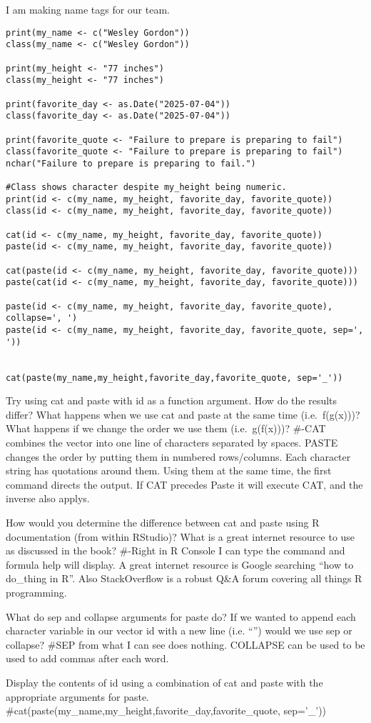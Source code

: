 \documentclass[]{article}
\begin{document}
I am making name tags for our team.

\begin{verbatim}
print(my_name <- c("Wesley Gordon"))
class(my_name <- c("Wesley Gordon"))

print(my_height <- "77 inches")
class(my_height <- "77 inches")

print(favorite_day <- as.Date("2025-07-04"))
class(favorite_day <- as.Date("2025-07-04"))

print(favorite_quote <- "Failure to prepare is preparing to fail")
class(favorite_quote <- "Failure to prepare is preparing to fail")
nchar("Failure to prepare is preparing to fail.")

#Class shows character despite my_height being numeric.
print(id <- c(my_name, my_height, favorite_day, favorite_quote))
class(id <- c(my_name, my_height, favorite_day, favorite_quote)) 

cat(id <- c(my_name, my_height, favorite_day, favorite_quote))
paste(id <- c(my_name, my_height, favorite_day, favorite_quote))

cat(paste(id <- c(my_name, my_height, favorite_day, favorite_quote)))
paste(cat(id <- c(my_name, my_height, favorite_day, favorite_quote)))

paste(id <- c(my_name, my_height, favorite_day, favorite_quote), collapse=', ')
paste(id <- c(my_name, my_height, favorite_day, favorite_quote, sep=', '))


cat(paste(my_name,my_height,favorite_day,favorite_quote, sep='_'))
\end{verbatim}

Try using cat and paste with id as a function argument. How do the
results differ? What happens when we use cat and paste at the same time
(i.e.~f(g(x)))? What happens if we change the order we use them
(i.e.~g(f(x)))? \#-CAT combines the vector into one line of characters
separated by spaces. PASTE changes the order by putting them in numbered
rows/columns. Each character string has quotations around them. Using
them at the same time, the first command directs the output. If CAT
precedes Paste it will execute CAT, and the inverse also applys.

How would you determine the difference between cat and paste using R
documentation (from within RStudio)? What is a great internet resource
to use as discussed in the book? \#-Right in R Console I can type the
command and formula help will display. A great internet resource is
Google searching ``how to do\_thing in R''. Also StackOverflow is a
robust Q\&A forum covering all things R programming.

What do sep and collapse arguments for paste do? If we wanted to append
each character variable in our vector id with a new line (i.e. ``\n'')
would we use sep or collapse? \#SEP from what I can see does nothing.
COLLAPSE can be used to be used to add commas after each word.

Display the contents of id using a combination of cat and paste with the
appropriate arguments for paste.
\#cat(paste(my\_name,my\_height,favorite\_day,favorite\_quote,
sep='\_'))
\end{document}
